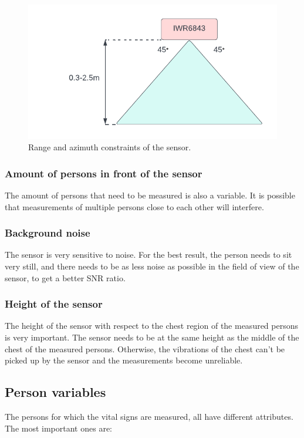 \begin{figure}[t]
    \centering
    \includegraphics[width=.6\textwidth]{figures/validation/range_metric.pdf}
    \caption{Range and azimuth constraints of the sensor.}
    \label{fig:range_metric}
\end{figure}

\subsubsection{Amount of persons in front of the sensor}
The amount of persons that need to be measured is also a variable. It is possible that measurements of multiple persons close to each other will interfere.

\subsubsection{Background noise}
The sensor is very sensitive to noise. For the best result, the person needs to sit very still, and there needs to be as less noise as possible in the field of view of the sensor, to get a better SNR ratio.

\subsubsection{Height of the sensor}
The height of the sensor with respect to the chest region of the measured persons is very important. The sensor needs to be at the same height as the middle of the chest of the measured persons. Otherwise, the vibrations of the chest can't be picked up by the sensor and the measurements become unreliable.

\subsection{Person variables}
\label{sec:person_metrics}
The persons for which the vital signs are measured, all have different attributes. The most important ones are:

